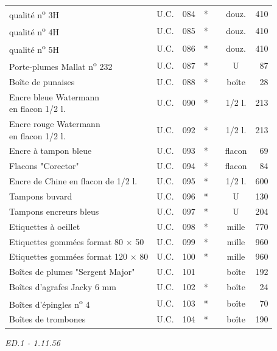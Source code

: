 {{\begin{tabular}{|l|c|r|c|c|c|r|}
\hspace{7em}qualité n\textsuperscript{o} 3H & U.C. & 084 & * &  & douz. & 410 \\
\hspace{7em}qualité n\textsuperscript{o} 4H & U.C. & 085 & * &  & douz. & 410 \\
\hspace{7em}qualité n\textsuperscript{o} 5H & U.C. & 086 & * &  & douz. & 410 \\
Porte-plumes Mallat n\textsuperscript{o} 232 & U.C. & 087 & * &  & U & 87 \\
Boîte de punaises & U.C. & 088 & * &  & boîte & 28 \\
\shortstack[l]{Encre bleue Watermann\\\quad en flacon 1/2 l.} & U.C. & 090 & * &  & 1/2 l. & 213 \\
\shortstack[l]{Encre rouge Watermann\\\quad en flacon 1/2 l.} & U.C. & 092 & * &  & 1/2 l. & 213 \\
Encre à tampon bleue & U.C. & 093 & * &  & flacon & 69 \\
Flacons "Corector" & U.C. & 094 & * &  & flacon & 84 \\
Encre de Chine en flacon de 1/2 l. & U.C. & 095 & * &  & 1/2 l. & 600 \\
Tampons buvard & U.C. & 096 & * &  & U & 130 \\
Tampons encreurs bleus & U.C. & 097 & * &  & U & 204 \\
Etiquettes à oeillet & U.C. & 098 & * &  & mille & 770 \\
Etiquettes gommées format 80 $\times$ 50 & U.C. & 099 & * &  & mille & 960 \\
Etiquettes gommées format 120 $\times$ 80 & U.C. & 100 & * &  & mille & 960 \\
Boîtes de plumes "Sergent Major" & U.C. & 101 &  &  & boîte & 192 \\
Boîtes d'agrafes Jacky 6 mm & U.C. & 102 & * &  & boîte & 24 \\
Boîtes d'épingles n\textsuperscript{o} 4 & U.C. & 103 & * &  & boîte & 70 \\
Boîtes de trombones & U.C. & 104 & * &  & boîte & 190 \\
\end{tabular}}}
\hfill\textit{ED.1 - 1.11.56}
